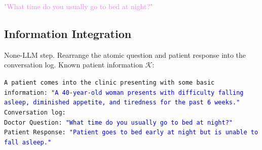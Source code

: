 \begin{tcolorbox}[title={Example LLM Output}, colframe=gray]
\small\textcolor{violet}{"What time do you usually go to bed at night?"}\normalsize
\end{tcolorbox}



\subsection{Information Integration}\label{app:expert_integrate}
None-LLM step. Rearrange the atomic question and patient response into the conversation log. 
Known patient information $\mathcal{K}$:
\begin{tcolorbox}[colframe=gray]
\small\texttt{A patient comes into the clinic presenting with some basic information: \textcolor{blue}{"A 40-year-old woman presents with difficulty falling asleep, diminished appetite, and tiredness for the past 6 weeks."}\vspace{4mm}\\
Conversation log:\\
Doctor Question: \textcolor{blue}{"What time do you usually go to bed at night?"}\\
Patient Response: \textcolor{blue}{"Patient goes to bed early at night but is unable to fall asleep."}}\normalsize
\end{tcolorbox}

